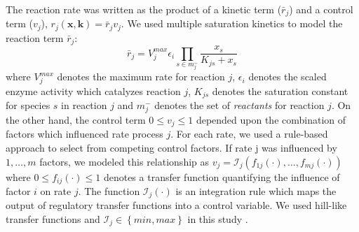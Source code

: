 \documentclass[12pt]{article}
\begin{document}
The reaction rate was written as the product of a kinetic term ($\bar{r}_{j}$) and a control term ($v_{j}$), $r_{j}\left(\mathbf{x},\mathbf{k}\right)=\bar{r}_{j}v_{j}$.
We used multiple saturation kinetics to model the reaction term $\bar{r}_{j}$:
\begin{equation}\label{eqn:rate-bar}
	\bar{r}_{j}=V_{j}^{max}\epsilon_{i}\prod_{s\in{m_{j}^{-}}}\frac{x_{s}}{K_{js} + x_{s}}
\end{equation}
where $V_{j}^{max}$ denotes the maximum rate for reaction $j$, $\epsilon_{i}$ denotes the scaled enzyme activity which catalyzes reaction $j$,
$K_{js}$ denotes the saturation constant for species $s$ in reaction $j$ and $m_{j}^{-}$ denotes the set of \textit{reactants} for reaction $j$.
On the other hand, the control term $0\leq v_{j}\leq 1$ depended upon the combination of factors which influenced rate process $j$.
For each rate, we used a rule-based approach to select from competing control factors.
If rate j was influenced by $1,\dots,m$ factors, we modeled this relationship as
$v_{j}=\mathcal{I}_{j}\left(f_{1j}\left(\cdot\right),\hdots,f_{mj}\left(\cdot\right)\right)$
where $0\leq f_{ij}\left(\cdot\right)\leq 1$ denotes a transfer function quantifying the influence of factor $i$ on rate $j$.
The function $\mathcal{I}_{j}\left(\cdot\right)$ is an integration rule which maps the output of regulatory transfer functions into a control
variable. We used hill-like transfer functions and $\mathcal{I}_{j}\in\left\{min,max\right\}$ in this study \cite{pr3010138}.
\end{document}
